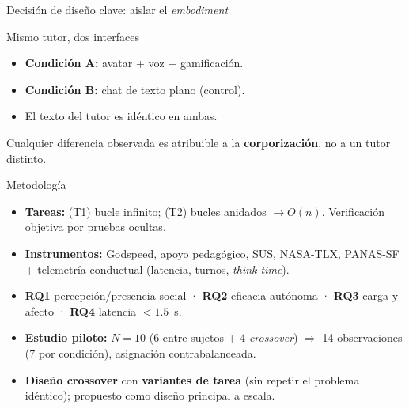 \documentclass[aspectratio=169]{beamer}
\begin{document}
\begin{frame}{Decisión de diseño clave: aislar el \emph{embodiment}}
  \begin{block}{Mismo tutor, dos interfaces}
    \begin{itemize}
      \item \textbf{Condición A:} avatar + voz + gamificación.
      \item \textbf{Condición B:} chat de texto plano (control).
      \item \alert{El texto del tutor es idéntico en ambas.}
    \end{itemize}
  \end{block}
  Cualquier diferencia observada es atribuible a la \textbf{corporización}, no a un tutor distinto.
\end{frame}

\begin{frame}{Metodología}
  \begin{itemize}
    \item \textbf{Tareas:} (T1) bucle infinito; (T2) bucles anidados $\to O(n)$. Verificación
          objetiva por pruebas ocultas.
    \item \textbf{Instrumentos:} Godspeed, apoyo pedagógico, SUS, NASA-TLX, PANAS-SF + telemetría
          conductual (latencia, turnos, \emph{think-time}).
    \item \textbf{RQ1} percepción/presencia social · \textbf{RQ2} eficacia autónoma · \textbf{RQ3}
          carga y afecto · \textbf{RQ4} latencia $<1.5$~s.
    \item \textbf{Estudio piloto:} $N=10$ (6 entre-sujetos + 4 \emph{crossover}) $\Rightarrow$
          14 observaciones (7 por condición), asignación contrabalanceada.
    \item \textbf{Diseño crossover} con \textbf{variantes de tarea} (sin repetir el problema
          idéntico); propuesto como diseño principal a escala.
  \end{itemize}
\end{frame}
\end{document}
